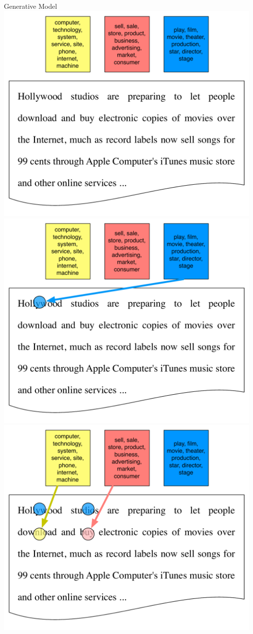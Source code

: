 \begin{frame}{Generative Model}
	\only<3> {   \includegraphics[width=.8\linewidth]{topic_models/inference_0}  }
	\only<4> {   \includegraphics[width=.8\linewidth]{topic_models/inference_1}  }
	\only<5> {   \includegraphics[width=.8\linewidth]{topic_models/inference_2}  }

\end{frame}
